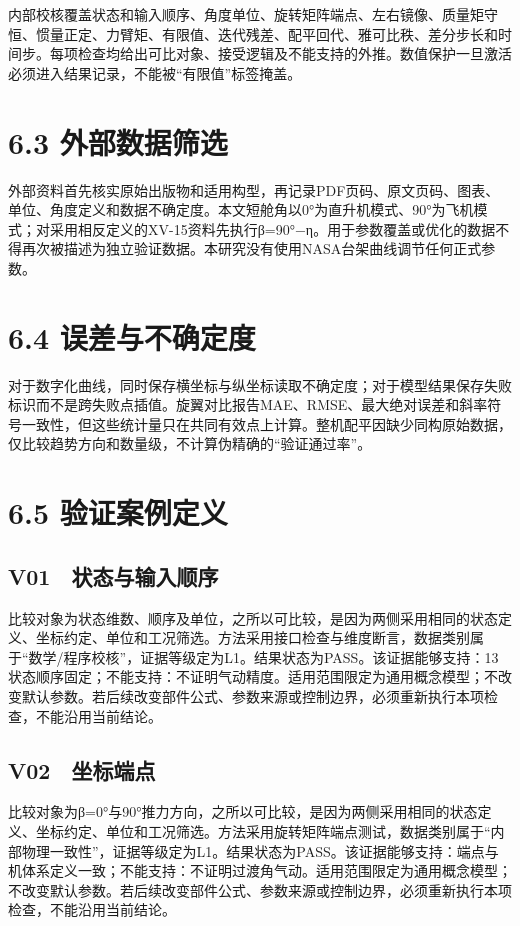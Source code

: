 \documentclass[UTF8,12pt,openany]{ctexbook}
\begin{document}
内部校核覆盖状态和输入顺序、角度单位、旋转矩阵端点、左右镜像、质量矩守恒、惯量正定、力臂矩、有限值、迭代残差、配平回代、雅可比秩、差分步长和时间步。每项检查均给出可比对象、接受逻辑及不能支持的外推。数值保护一旦激活必须进入结果记录，不能被“有限值”标签掩盖。

\section{6.3 外部数据筛选}

外部资料首先核实原始出版物和适用构型，再记录PDF页码、原文页码、图表、单位、角度定义和数据不确定度。本文短舱角以0°为直升机模式、90°为飞机模式；对采用相反定义的XV-15资料先执行β=90°−η。用于参数覆盖或优化的数据不得再次被描述为独立验证数据。本研究没有使用NASA台架曲线调节任何正式参数。

\section{6.4 误差与不确定度}

对于数字化曲线，同时保存横坐标与纵坐标读取不确定度；对于模型结果保存失败标识而不是跨失败点插值。旋翼对比报告MAE、RMSE、最大绝对误差和斜率符号一致性，但这些统计量只在共同有效点上计算。整机配平因缺少同构原始数据，仅比较趋势方向和数量级，不计算伪精确的“验证通过率”。

\section{6.5 验证案例定义}

\subsection{V01　状态与输入顺序}

比较对象为状态维数、顺序及单位，之所以可比较，是因为两侧采用相同的状态定义、坐标约定、单位和工况筛选。方法采用接口检查与维度断言，数据类别属于“数学/程序校核”，证据等级定为L1。结果状态为PASS。该证据能够支持：13状态顺序固定；不能支持：不证明气动精度。适用范围限定为通用概念模型；不改变默认参数。若后续改变部件公式、参数来源或控制边界，必须重新执行本项检查，不能沿用当前结论。

\subsection{V02　坐标端点}

比较对象为β=0°与90°推力方向，之所以可比较，是因为两侧采用相同的状态定义、坐标约定、单位和工况筛选。方法采用旋转矩阵端点测试，数据类别属于“内部物理一致性”，证据等级定为L1。结果状态为PASS。该证据能够支持：端点与机体系定义一致；不能支持：不证明过渡角气动。适用范围限定为通用概念模型；不改变默认参数。若后续改变部件公式、参数来源或控制边界，必须重新执行本项检查，不能沿用当前结论。
\end{document}
